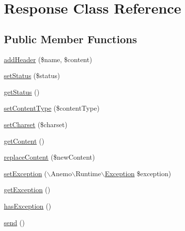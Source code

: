 \hypertarget{class_anemo_1_1_application_1_1_http_1_1_response}{
\section{Response Class Reference}
\label{class_anemo_1_1_application_1_1_http_1_1_response}
}
\subsection*{Public Member Functions}
\begin{DoxyCompactItemize}
\item 
\hyperlink{class_anemo_1_1_application_1_1_http_1_1_response_a483870774b6f8e29219a5f220a0bc9d3}{addHeader} (\$name, \$content)
\item 
\hyperlink{class_anemo_1_1_application_1_1_http_1_1_response_a7d02c100d684fe1dffc6cb3486a48511}{setStatus} (\$status)
\item 
\hyperlink{class_anemo_1_1_application_1_1_http_1_1_response_a9d21636071f529e2154051d3ea6e5921}{getStatus} ()
\item 
\hyperlink{class_anemo_1_1_application_1_1_http_1_1_response_a945b1a5744b810fcb31a05f827356cfa}{setContentType} (\$contentType)
\item 
\hyperlink{class_anemo_1_1_application_1_1_http_1_1_response_a81ee11b0f5fadecaece55170fea54b29}{setCharset} (\$charset)
\item 
\hyperlink{class_anemo_1_1_application_1_1_http_1_1_response_a58e43f09a06ce4e29b192c4e17ce7915}{getContent} ()
\item 
\hyperlink{class_anemo_1_1_application_1_1_http_1_1_response_a9eaad4ac82524f3b2f5a0d63926926ae}{replaceContent} (\$newContent)
\item 
\hyperlink{class_anemo_1_1_application_1_1_http_1_1_response_a111d0271feafeec670338c20d028a13b}{setException} ($\backslash$Anemo$\backslash$Runtime$\backslash$\hyperlink{class_anemo_1_1_application_1_1_http_1_1_exception}{Exception} \$exception)
\item 
\hyperlink{class_anemo_1_1_application_1_1_http_1_1_response_a31ec439e56ccf74108b96587373a112c}{getException} ()
\item 
\hyperlink{class_anemo_1_1_application_1_1_http_1_1_response_ade8585f0135f27c77faca0ec65ce7d80}{hasException} ()
\item 
\hyperlink{class_anemo_1_1_application_1_1_http_1_1_response_a12bcef5130168b80d3d52dc82213f19a}{send} ()
\end{DoxyCompactItemize}
